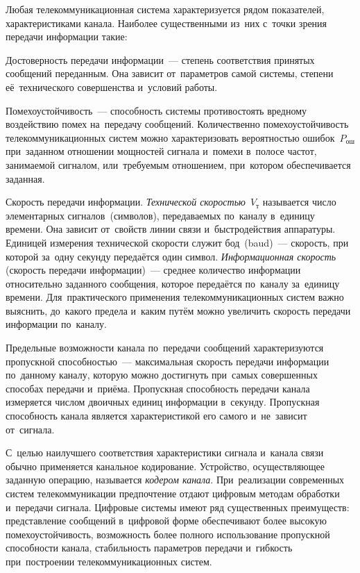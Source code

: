 \documentclass[
	a4paper,
	oneside,
	BCOR = 10mm,
	DIV = 12,
	12pt,
	headings = normal,
]{scrartcl}
\begin{document}
			Любая телекоммуникационная система характеризуется рядом показателей, характеристиками канала. Наиболее существенными из~них с~точки зрения передачи информации такие:
			\begin{enumlong}
				\item Достоверность передачи информации~— степень соответствия принятых сообщений переданным. Она зависит от~параметров самой системы, степени её~технического совершенства и~условий работы.
				\item Помехоустойчивость~— способность системы противостоять вредному воздействию помех на~передачу сообщений. Количественно помехоустойчивость телекоммуникационных систем можно характеризовать вероятностью ошибок~$P_{\text{ош}}$ при~заданном отношении мощностей сигнала и~помехи в~полосе частот, занимаемой сигналом, или~требуемым отношением, при~котором обеспечивается заданная.
				\item Скорость передачи информации. \emph{Технической скоростью}~$V_{\text{т}}$ называется число элементарных сигналов~(символов), передаваемых по~каналу в~единицу времени. Она зависит от~свойств линии связи и~быстродействия аппаратуры. Единицей измерения технической скорости служит бод~(baud)~— скорость, при которой за~одну секунду передаётся один символ. \emph{Информационная скорость} (скорость передачи информации)~— среднее количество информации относительно заданного сообщения, которое передаётся по~каналу за~единицу времени. Для~практического применения телекоммуникационных систем важно выяснить, до~какого предела и~каким путём можно увеличить скорость передачи информации по~каналу.
				\item Предельные возможности канала по~передачи сообщений характеризуются пропускной способностью~— максимальная скорость передачи информации по~данному каналу, которую можно достигнуть при~самых совершенных способах передачи и~приёма. Пропускная способность передачи канала измеряется числом двоичных единиц информации в~секунду. Пропускная способность канала является характеристикой его самого и~не~зависит от~сигнала. 
			\end{enumlong}

			С~целью наилучшего соответствия характеристики сигнала и~канала связи обычно применяется канальное кодирование. Устройство, осуществляющее заданную операцию, называется \emph{кодером канала}. При~реализации современных систем телекоммуникации предпочтение отдают цифровым методам обработки и~передачи сигнала. Цифровые системы имеют ряд существенных преимуществ: представление сообщений в~цифровой форме обеспечивают более высокую помехоустойчивость, возможность более полного использование пропускной способности канала, стабильность параметров передачи и~гибкость при~построении телекоммуникационных систем.
\end{document}
